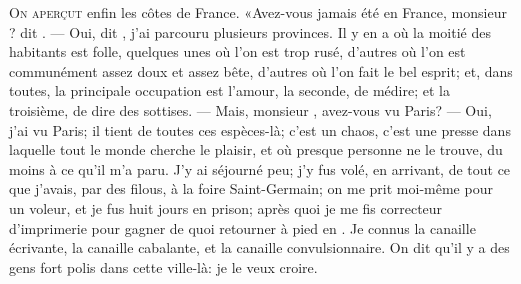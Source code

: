 \lettrine{O}{n aperçut} enfin les côtes de France. «Avez-vous jamais été en France,
monsieur ? dit . — Oui, dit , j’ai parcouru plusieurs
provinces. Il y en a où la moitié des habitants est folle, quelques
unes où l’on est trop rusé, d’autres où l’on est communément assez doux
et assez bête, d’autres où l’on fait le bel esprit; et, dans toutes, la
principale occupation est l’amour, la seconde, de médire; et la
troisième, de dire des sottises. — Mais, monsieur , avez-vous vu
Paris? — Oui, j’ai vu Paris; il tient de toutes ces espèces-là; c’est un
chaos, c’est une presse dans laquelle tout le monde cherche le plaisir,
et où presque personne ne le trouve, du moins à ce qu’il m’a paru. J’y
ai séjourné peu; j’y fus volé, en arrivant, de tout ce que j’avais, par
des filous, à la foire Saint-Germain; on me prit moi-même pour un
voleur, et je fus huit jours en prison; après quoi je me fis correcteur
d’imprimerie pour gagner de quoi retourner à pied en . Je
connus la canaille écrivante, la canaille cabalante, et la canaille
convulsionnaire. On dit qu’il y a des gens fort polis dans cette
ville-là: je le veux croire.

